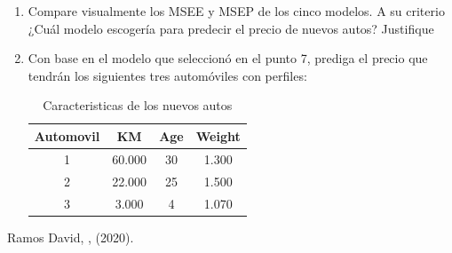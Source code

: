 \documentclass[11pt,letterpaper]{article}\usepackage[]{graphicx}\usepackage[]{color}
\begin{document}
\begin{enumerate}
    
    \item Compare visualmente los MSEE y MSEP de los cinco modelos. A su criterio ¿Cuál modelo escogería para predecir el precio de nuevos autos? Justifique
    \item Con base en el modelo que seleccionó en el punto 7, prediga el precio que tendrán los siguientes tres automóviles con perfiles:
    \begin{table}[H]
        \centering
        \begin{tabular}{|c|c|c|c|}\hline
           \textbf{Automovil}  &  \textbf{KM} & \textbf{Age} & \textbf{Weight} \\ \hline
             1 & 60.000 &30 & 1.300 \\ \hline
            2 & 22.000 & 25  & 1.500 \\ \hline
           3 &  3.000 & 4  & 1.070 \\ \hline
            
        \end{tabular}
        \caption{Caracteristicas de los nuevos autos}
        \label{tab:my_label}
    \end{table}
\end{enumerate}
\begin{thebibliography}{1} %
 Ramos David,
,
\newblock  (2020).

\end{thebibliography}
\end{document}
